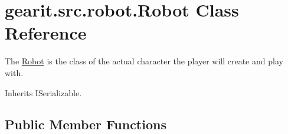 \hypertarget{classgearit_1_1src_1_1robot_1_1_robot}{\section{gearit.\+src.\+robot.\+Robot Class Reference}
\label{classgearit_1_1src_1_1robot_1_1_robot}
}


The \hyperlink{classgearit_1_1src_1_1robot_1_1_robot}{Robot} is the class of the actual character the player will create and play with.  




Inherits I\+Serializable.

\subsection*{Public Member Functions}

